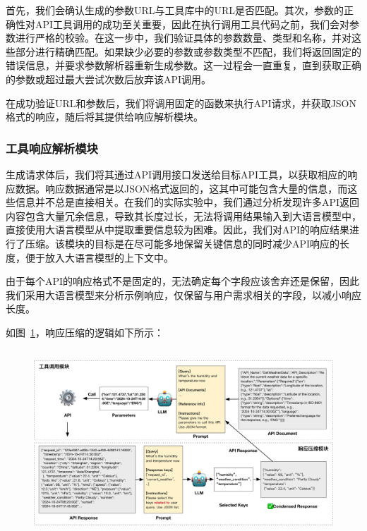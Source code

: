 首先，我们会确认生成的参数URL与工具库中的URL是否匹配。其次，参数的正确性对API工具调用的成功至关重要，因此在执行调用工具代码之前，我们会对参数进行严格的校验。在这一步中，我们验证具体的参数数量、类型和名称，并对这些部分进行精确匹配。如果缺少必要的参数或参数类型不匹配，我们将返回固定的错误信息，并要求参数解析器重新生成参数。这一过程会一直重复，直到获取正确的参数或超过最大尝试次数后放弃该API调用。

在成功验证URL和参数后，我们将调用固定的函数来执行API请求，并获取JSON格式的响应，随后将其提供给响应解析模块。

\subsubsection{工具响应解析模块}

生成请求体后，我们将其通过API调用接口发送给目标API工具，以获取相应的响应数据。响应数据通常是以JSON格式返回的，这其中可能包含大量的信息，而这些信息并不总是直接相关。在我们的实际实验中，我们通过分析发现许多API返回内容包含大量冗余信息，导致其长度过长，无法将调用结果输入到大语言模型中，直接使用大语言模型从中提取重要信息较为困难。因此，我们对API的响应结果进行了压缩。该模块的目标是在尽可能多地保留关键信息的同时减少API响应的长度，便于放入大语言模型的上下文中。

由于每个API的响应格式不是固定的，无法确定每个字段应该舍弃还是保留，因此我们采用大语言模型来分析示例响应，仅保留与用户需求相关的字段，以减小响应长度。

如图~\ref{fig:ch4-compression}，响应压缩的逻辑如下所示：

\begin{figure}[!htp]
  \vspace{1em}
  \centering
  \setlength{\abovecaptionskip}{10pt} %
  \includegraphics[height=7cm]{../assets/ch4-工具调用模块.pdf}
  \label{fig:ch4-compression}
\end{figure}

